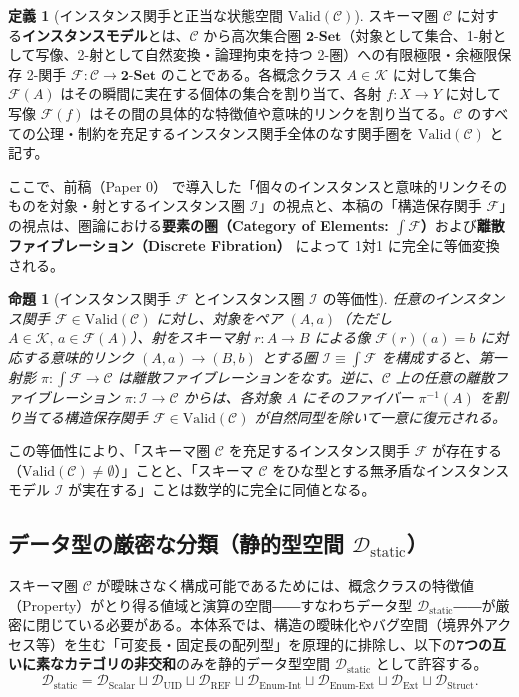 \documentclass[11pt,a4paper]{ltjsarticle}
\theoremstyle{definition}
\newtheorem{definition}{定義}[section]
\theoremstyle{plain}
\newtheorem{proposition}{命題}[section]
\theoremstyle{remark}
\newcommand{\Valid}{\mathrm{Valid}}
\newcommand{\TwoSet}{\mathbf{2\text{-}Set}}
\newcommand{\Dstatic}{\mathcal{D}_{\mathrm{static}}}
\newcommand{\Dscalar}{\mathcal{D}_{\mathrm{Scalar}}}
\newcommand{\Duid}{\mathcal{D}_{\mathrm{UID}}}
\newcommand{\Dref}{\mathcal{D}_{\mathrm{REF}}}
\newcommand{\Denumint}{\mathcal{D}_{\mathrm{Enum\text{-}Int}}}
\newcommand{\Denumext}{\mathcal{D}_{\mathrm{Enum\text{-}Ext}}}
\newcommand{\Dext}{\mathcal{D}_{\mathrm{Ext}}}
\newcommand{\Dstruct}{\mathcal{D}_{\mathrm{Struct}}}
\begin{document}
\begin{definition}[インスタンス関手と正当な状態空間 $\Valid(\mathcal{C})$]\label{def:instance-functor}
スキーマ圏 $\mathcal{C}$ に対する\textbf{インスタンスモデル}とは、$\mathcal{C}$ から高次集合圏 $\TwoSet$（対象として集合、1-射として写像、2-射として自然変換・論理拘束を持つ 2-圏）への有限極限・余極限保存 2-関手 $\mathcal{F} : \mathcal{C} \to \TwoSet$ のことである。各概念クラス $A \in \mathcal{K}$ に対して集合 $\mathcal{F}(A)$ はその瞬間に実在する個体の集合を割り当て、各射 $f : X \to Y$ に対して写像 $\mathcal{F}(f)$ はその間の具体的な特徴値や意味的リンクを割り当てる。$\mathcal{C}$ のすべての公理・制約を充足するインスタンス関手全体のなす関手圏を $\Valid(\mathcal{C})$ と記す。
\end{definition}

ここで、前稿（Paper 0）\cite{ota2026paper0} で導入した「個々のインスタンスと意味的リンクそのものを対象・射とするインスタンス圏 $\mathcal{I}$」の視点と、本稿の「構造保存関手 $\mathcal{F}$」の視点は、圏論における\textbf{要素の圏（Category of Elements: $\int \mathcal{F}$）}および\textbf{離散ファイブレーション（Discrete Fibration）}\cite{maclane1998,spivak2012} によって 1対1 に完全に等価変換される。

\begin{proposition}[インスタンス関手 $\mathcal{F}$ とインスタンス圏 $\mathcal{I}$ の等価性]\label{prop:cat-elements}
任意のインスタンス関手 $\mathcal{F} \in \Valid(\mathcal{C})$ に対し、対象をペア $(A, a)$（ただし $A \in \mathcal{K},\, a \in \mathcal{F}(A)$）、射をスキーマ射 $r : A \to B$ による像 $\mathcal{F}(r)(a) = b$ に対応する意味的リンク $(A, a) \to (B, b)$ とする圏 $\mathcal{I} \equiv \int \mathcal{F}$ を構成すると、第一射影 $\pi : \int \mathcal{F} \to \mathcal{C}$ は離散ファイブレーションをなす。逆に、$\mathcal{C}$ 上の任意の離散ファイブレーション $\pi : \mathcal{I} \to \mathcal{C}$ からは、各対象 $A$ にそのファイバー $\pi^{-1}(A)$ を割り当てる構造保存関手 $\mathcal{F} \in \Valid(\mathcal{C})$ が自然同型を除いて一意に復元される。
\end{proposition}

この等価性により、「スキーマ圏 $\mathcal{C}$ を充足するインスタンス関手 $\mathcal{F}$ が存在する（$\Valid(\mathcal{C}) \neq \emptyset$）」ことと、「スキーマ $\mathcal{C}$ をひな型とする無矛盾なインスタンスモデル $\mathcal{I}$ が実在する」ことは数学的に完全に同値となる。

\subsection{データ型の厳密な分類（静的型空間 $\Dstatic$）}
スキーマ圏 $\mathcal{C}$ が曖昧さなく構成可能であるためには、概念クラスの特徴値（Property）がとり得る値域と演算の空間――すなわちデータ型 $\Dstatic$――が厳密に閉じている必要がある。本体系では、構造の曖昧化やバグ空間（境界外アクセス等）を生む「可変長・固定長の配列型」を原理的に排除し、以下の\textbf{7つの互いに素なカテゴリの非交和}のみを静的データ型空間 $\Dstatic$ として許容する。
\begin{equation}
\Dstatic = \Dscalar \sqcup \Duid \sqcup \Dref \sqcup \Denumint \sqcup \Denumext \sqcup \Dext \sqcup \Dstruct.
\end{equation}
\end{document}
